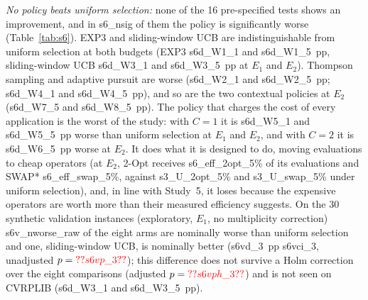 \emph{No policy beats uniform selection:} none of the 16 pre-specified tests shows an improvement, and in \num{s6_nsig} of them the policy is significantly worse (Table~\ref{tab:s6}). EXP3 and sliding-window UCB are indistinguishable from uniform selection at both budgets (EXP3 \num{s6d_W1_1} and \num{s6d_W1_5}~pp, sliding-window UCB \num{s6d_W3_1} and \num{s6d_W3_5}~pp at $E_1$ and $E_2$). Thompson sampling and adaptive pursuit are worse (\num{s6d_W2_1} and \num{s6d_W2_5}~pp; \num{s6d_W4_1} and \num{s6d_W4_5}~pp), and so are the two contextual policies at $E_2$ (\num{s6d_W7_5} and \num{s6d_W8_5}~pp). The policy that charges the cost of every application is the worst of the study: with $C=1$ it is \num{s6d_W5_1} and \num{s6d_W5_5}~pp worse than uniform selection at $E_1$ and $E_2$, and with $C=2$ it is \num{s6d_W6_5}~pp worse at $E_2$. It does what it is designed to do, moving evaluations to cheap operators (at $E_2$, 2-Opt receives \num{s6_eff_2opt_5}\% of its evaluations and SWAP* \num{s6_eff_swap_5}\%, against \num{s3_U_2opt_5}\% and \num{s3_U_swap_5}\% under uniform selection), and, in line with Study~5, it loses because the expensive operators are worth more than their measured efficiency suggests. On the 30 synthetic validation instances (exploratory, $E_1$, no multiplicity correction) \num{s6v_nworse_raw} of the eight arms are nominally worse than uniform selection and one, sliding-window UCB, is nominally better (\num{s6vd_3}~pp \num{s6vci_3}, unadjusted $p=\num{s6vp_3}$); this difference does not survive a Holm correction over the eight comparisons (adjusted $p=\num{s6vph_3}$) and is not seen on CVRPLIB (\num{s6d_W3_1} and \num{s6d_W3_5}~pp).

